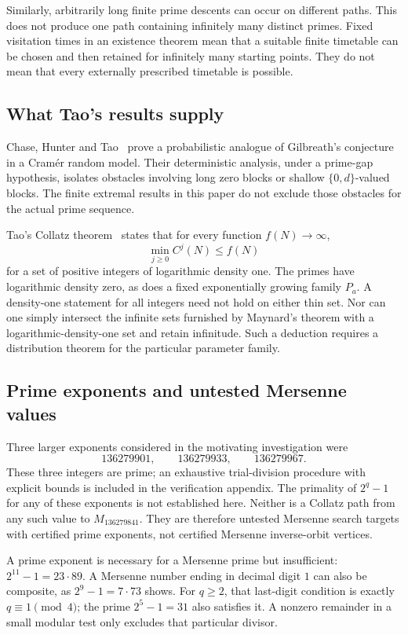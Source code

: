 \documentclass[11pt,a4paper]{article}
\theoremstyle{definition}
\theoremstyle{remark}
\numberwithin{equation}{section}
\begin{document}
Similarly, arbitrarily long finite prime descents can occur on different
paths. This does not produce one path containing infinitely many distinct
primes. Fixed visitation times in an existence theorem mean that a suitable
finite timetable can be chosen and then retained for infinitely many starting
points. They do not mean that every externally prescribed timetable is possible.

\subsection{What Tao's results supply}
Chase, Hunter and Tao~\cite{R004} prove a probabilistic analogue of Gilbreath's
conjecture in a Cram\'er random model. Their deterministic analysis, under a
prime-gap hypothesis, isolates obstacles involving long zero blocks or shallow
$\{0,d\}$-valued blocks. The finite extremal results in this paper do not
exclude those obstacles for the actual prime sequence.

Tao's Collatz theorem~\cite{R010} states that for every function $f(N)\to\infty$,
\[
\min_{j\ge0}C^j(N)\le f(N)
\]
for a set of positive integers of logarithmic density one. The primes have
logarithmic density zero, as does a fixed exponentially growing family $P_a$.
A density-one statement for all integers need not hold on either thin set.
Nor can one simply intersect the infinite sets furnished by Maynard's theorem
with a logarithmic-density-one set and retain infinitude. Such a deduction
requires a distribution theorem for the particular parameter family.

\subsection{Prime exponents and untested Mersenne values}
Three larger exponents considered in the motivating investigation were
\[
136279901,\qquad136279933,\qquad136279967.
\]
These three integers are prime; an exhaustive trial-division procedure with
explicit bounds is included in the verification appendix. The primality of
$2^q-1$ for any of these exponents is not established here. Neither is a
Collatz path from any such value to $M_{136279841}$. They are therefore
untested Mersenne search targets with certified prime exponents, not certified
Mersenne inverse-orbit vertices.

A prime exponent is necessary for a Mersenne prime but insufficient:
$2^{11}-1=23\cdot89$. A Mersenne number ending in decimal digit $1$ can also
be composite, as $2^9-1=7\cdot73$ shows. For $q\ge2$, that last-digit
condition is exactly $q\equiv1\pmod4$; the prime $2^5-1=31$ also satisfies
it. A nonzero remainder in a small modular test only excludes that particular
divisor.
\end{document}
